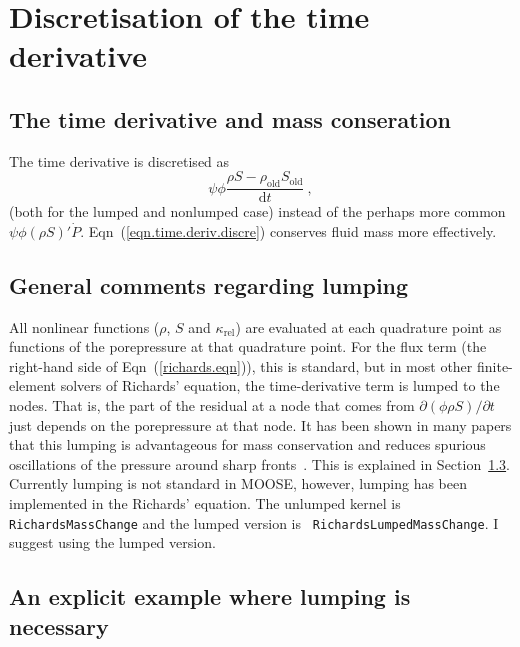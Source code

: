 \documentclass[]{scrreprt}
\begin{document}
\chapter{Discretisation of the time derivative}
\label{discret.chap}

\section{The time derivative and mass conseration}

The time derivative is discretised as
\begin{equation}
\psi\phi \frac{\rho S -
  \rho_{\mathrm{old}}S_{\mathrm{old}}}{\mathrm{d}t} \ ,
\label{eqn.time.deriv.discre}
\end{equation}
(both for the lumped and nonlumped case) instead of the perhaps more
common $\psi\phi (\rho S)'\dot{P}$.  Eqn~(\ref{eqn.time.deriv.discre})
conserves fluid mass more effectively.


\section{General comments regarding lumping}

All nonlinear functions ($\rho$, $S$ and $\kappa_{\mathrm{rel}}$) are
evaluated at each quadrature point as functions of the porepressure at
that quadrature point.  For the flux term (the right-hand side of
Eqn~(\ref{richards.eqn})), this is standard, but in most other
finite-element solvers of Richards' equation, the time-derivative term
is lumped to the nodes.  That is, the part of the residual at a node
that comes from $\partial(\phi\rho S)/\partial t$ just depends on the
porepressure at that node.  It has been shown in many papers that this
lumping is advantageous for mass conservation and reduces spurious
oscillations of the pressure around sharp fronts~\cite{celiaET1990}.
This is explained in Section~\ref{sec.lumping.timde.deriv}.  Currently
lumping is not standard in MOOSE, however, lumping has been
implemented in the Richards' equation.  The unlumped kernel is {\tt
  RichardsMassChange} and the lumped version is {\tt
  RichardsLumpedMassChange}.  I suggest using the lumped version.

\section{An explicit example where lumping is necessary}
\label{sec.lumping.timde.deriv}
\end{document}
